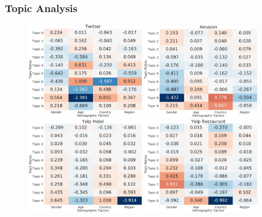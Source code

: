 
\subsubsection{Topic Analysis}


\begin{figure}[t!]
\centering
\includegraphics[width=0.44\textwidth]{./images/chapter4/twitter_ratio.pdf}
\includegraphics[width=0.44\textwidth]{./images/chapter4/amazon_ratio.pdf}
\newline
\includegraphics[width=0.44\textwidth]{./images/chapter4/yelp_hotel_ratio.pdf}
\includegraphics[width=0.44\textwidth]{./images/chapter4/yelp_rest_ratio.pdf}

\end{figure}
